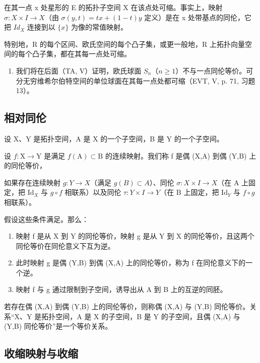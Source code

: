 在其一点 x 处星形的 E 的拓扑子空间 X 在该点处可缩。事实上，映射 \(\sigma\colon X \times I \to X\)（由 \(\sigma(y,t) = tx + (1 - t)y\) 定义）是在 x 处带基点的同伦，它把 \(Id_{X}\) 连接到以 \(\{x\}\) 为像的常值映射。

特别地，R 的每个区间、欧氏空间的每个凸子集，或更一般地，R 上拓扑向量空间的每个凸子集，都在其每一点处可缩。

\begin{enumerate}
\def\labelenumi{\arabic{enumi})}
\setcounter{enumi}{4}
\tightlist
\item
  我们将在后面（TA, V）证明，欧氏球面 \(S_n\)（\(n\geqslant1\)）不与一点同伦等价。可分无穷维希尔伯特空间的单位球面在其每一点处都可缩（EVT, V, p. 71, 习题 13）。
\end{enumerate}

\subsection{相对同伦}

设 X、Y 是拓扑空间，A 是 X 的一个子空间，B 是 Y 的一个子空间。

设 \(f:\mathrm{X}\to\mathrm{Y}\) 是满足 \(f(\mathrm{A})\subset\mathrm{B}\) 的连续映射。我们称 f 是偶 (X,A) 到偶 (Y,B) 上的同伦等价，

如果存在连续映射 \(g\colon Y\to X\)（满足 \(g(B)\subset A\)）、同伦 \(\sigma\colon X\times I\to X\)（在 A 上固定，把 \(\text{Id}_X\) 与 \(g\circ f\) 相联系）以及同伦 \(\tau\colon Y\times I\to Y\)（在 B 上固定，把 \(\text{Id}_Y\) 与 \(f\circ g\) 相联系）。

假设这些条件满足。那么：

\begin{enumerate}
\def\labelenumi{\alph{enumi})}
\item
  映射 f 是从 X 到 Y 的同伦等价，映射 g 是从 Y 到 X 的同伦等价，且这两个同伦等价在同伦意义下互为逆。
\item
  此时映射 g 是偶 (Y,B) 到偶 (X,A) 上的同伦等价，称为 f 在同伦意义下的一个逆。
\item
  映射 f 与 g 通过限制到子空间，诱导出从 A 到 B 上的互逆的同胚。
\end{enumerate}

若存在偶 (X,A) 到偶 (Y,B) 上的同伦等价，则称偶 (X,A) 与 (Y,B) 同伦等价。关系“X、Y 是拓扑空间，A 是 X 的子空间，B 是 Y 的子空间，且偶 (X,A) 与 (Y,B) 同伦等价”是一个等价关系。

\subsection{收缩映射与收缩}

